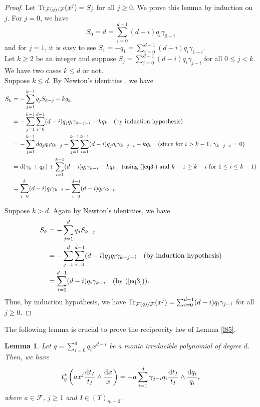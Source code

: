 \documentclass[times,10pt]{amsart}
\newcommand{\dd}{{\rm d}}
\newcommand{\F}{\ensuremath{\mathcal{F}}}
\newtheorem{lemma}[thm]{Lemma}%
\begin{document}
 \begin{proof}
Let $ {\rm Tr}_{\F(q)/{\F}}(x^j)=S_j$ for all $j\geq 0$. We prove this lemma by induction on $j$. For $j=0$, we have  $$S_0=d= \sum_{i=0}^{d-1} (d-i)q_i \gamma_{0-i} $$and for $j=1$, it is easy to see $S_1= -q_1= \sum_{i=0}^{d-1} (d-i)q_i \gamma_{1-i} $. \\

Let $k\geq 2$ be an integer and {suppose} $S_j= \sum_{i=0}^{d-1}(d-i) q_i \gamma_{j-i}$ for all $0\leq j<k$.  We have two cases $ k\leq d$ or not.\\

  {Suppose $k\leq d$.} {By Newton's identities \cite[Proposition 12.6]{M}}, we have \begin{align*}
 S_k&= -\sum_{j=1}^{k-1} q_jS_{k-j}- kq_k\\&=-\sum_{j=1}^{k-1} \sum_{i=0}^{d-1} (d-i)q_j q_i \gamma_{k-j-i}-kq_k\quad ( \text{by induction hypothesis})\\&= -\sum_{j=1}^{k-1} dq_jq_0\gamma_{k-j}- \sum_{j=1}^{k-1}\sum_{i=1}^{k-1}(d-i) q_jq_i\gamma_{k-j-i}-kq_k\quad (\text{since for  $i>k-1$,  $\gamma_{k-j-i}=0$})\\&= d(\gamma_k+ q_k)+\sum_{i=1}^{k-1}(d-i)q_i\gamma_{k-i}-kq_k  \quad (\text{using  (\ref{eq3}) and  $ k-1\geq k-i$ for  $1\leq i\leq k-1$})\\&= \sum_{i=0}^{k}(d-i) q_i \gamma_{k-i}= \sum_{i=0}^{d-1} (d-i) q_i\gamma_{k-i}.
                                \end{align*}

  {Suppose $k>d$. Again by Newton's identities,} we have\begin{align*}
S_k&= -\sum_{j=1}^{d} q_j S_{k-j}\\&= -\sum_{j=1}^{d} \sum_{i=0}^{d-1}(d-i)q_jq_i\gamma_{k-j-i}\quad \text{(by induction hypothesis)}\\&= \sum_{i=0}^{d-1}(d-i) q_i\gamma_{k-i}\quad \text{(by (\ref{eq3})).}  
 \end{align*}    Thus, by induction hypothesis, we have $ {\rm Tr}_{\F(q)/{\F}}(x^j)= \sum_{i=0}^{d-1} (d-i) q_i \gamma_{j-i}$ for all $j\geq 0$.                             
                           \end{proof}
The following lemma  is crucial    to prove the reciprocity law of Lemma \ref{l85}.
 \begin{lemma}\label{l82}
     Let $q=\sum_{i=0}^{d}q_ix^{d-i}$ be a monic irreducible polynomial of degree $d$.  Then, we have {$$t_q^*\left( ax^j \frac{\dd t_I}{t_I}\wedge \frac{\dd x}{x}\right)= -a\sum_{i=1}^{d} \gamma_{j-i} q_i \frac{\dd t_I}{t_I}\wedge \frac{\dd q_i}{q_i},$$}where $a\in \F$,  $j\geq 1$ and $I\in (T)_{m-2}$.
 \end{lemma}     
\end{document}
